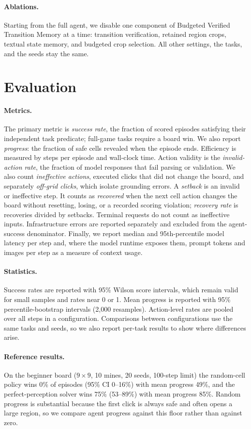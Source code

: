 \paragraph{Ablations.}
Starting from the full agent, we disable one component of Budgeted Verified Transition
Memory at a time: transition verification, retained region crops, textual state memory,
and budgeted crop selection. All other settings, the tasks, and the seeds stay the same.

\section{Evaluation}

\paragraph{Metrics.}
The primary metric is \emph{success rate}, the fraction of scored episodes satisfying
their independent task predicate; full-game tasks require a board win. We
also report \emph{progress}: the fraction of safe cells revealed when the episode ends.
Efficiency is measured by steps per episode and wall-clock time. Action validity is the
\emph{invalid-action rate}, the fraction of model responses that fail parsing or
validation. We also count \emph{ineffective actions}, executed clicks that did not change
the board, and separately \emph{off-grid clicks}, which isolate grounding errors. A
\emph{setback} is an invalid or ineffective step. It counts as \emph{recovered} when the
next cell action changes the board without resetting, losing, or a recorded scoring
violation; \emph{recovery rate} is recoveries divided by setbacks.
Terminal requests do not count as ineffective inputs. Infrastructure errors are
reported separately and excluded from the agent-success denominator.
Finally, we report median and 95th-percentile model latency per step and, where the model
runtime exposes them, prompt tokens and images per step as a measure of context usage.

\paragraph{Statistics.}
Success rates are reported with 95\% Wilson score intervals, which remain valid for small
samples and rates near 0 or 1. Mean progress is reported with 95\% percentile-bootstrap
intervals (2{,}000 resamples). Action-level rates are pooled over all steps in a
configuration. Comparisons between configurations use the same tasks and seeds, so we
also report per-task results to show where differences arise.

\paragraph{Reference results.}
On the beginner board ($9{\times}9$, 10 mines, 20 seeds, 100-step limit) the random-cell
policy wins 0\% of episodes (95\% CI 0--16\%) with mean progress 49\%, and the
perfect-perception solver wins 75\% (53--89\%) with mean progress 85\%. Random progress is
substantial because the first click is always safe and often opens a large region, so we
compare agent progress against this floor rather than against zero.
